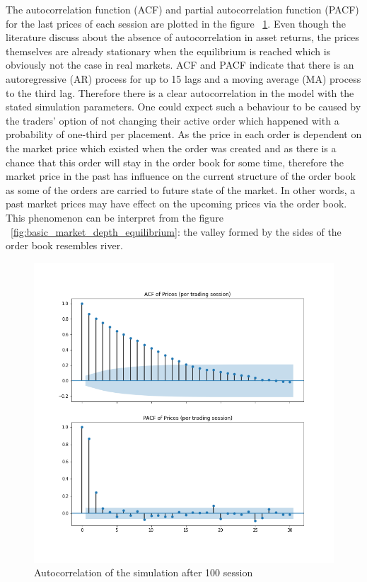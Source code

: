 The autocorrelation function (ACF) and partial autocorrelation function (PACF) for the last prices of
each session are plotted in the figure ~\ref{fig:basic_autocorr}. Even though the literature discuss
about the absence of autocorrelation in asset returns, the prices themselves are already stationary when
the equilibrium is reached which is obviously not the case in real markets. ACF and PACF indicate that there is 
an autoregressive (AR) process for up to 15 lags and a moving average (MA) process to the third lag. Therefore
there is a clear autocorrelation in the model with the stated simulation parameters. One could expect such
a behaviour to be caused by the traders' option of not changing their active order which happened with a probability of
one-third per placement. As the price in each order
is dependent on the market price which existed when the order was created and as there is a chance that
this order will stay in the order book for some time, therefore the market price in the past has influence on the
current structure of the order book as some of the orders are carried to future state of the market. 
In other words, a past market prices may have effect on the upcoming prices via the order book.
This phenomenon can be interpret from the figure ~\ref{fig:basic_market_depth_equilibrium}: the valley
formed by the sides of the order book resembles river.

\begin{figure}
    \includegraphics[width=\linewidth]{plots/basic_autocorrelation.png}
    \caption{Autocorrelation of the simulation after 100 session}
    \label{fig:basic_autocorr}
\end{figure}

